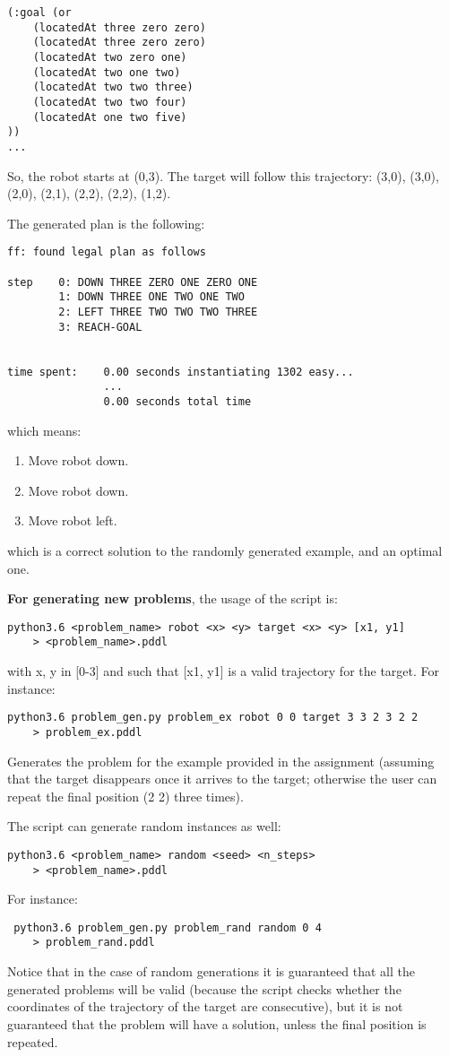 \documentclass{article}
\begin{document}
\begin{enumerate}
\begin{verbatim}
(:goal (or
    (locatedAt three zero zero)
    (locatedAt three zero zero)
    (locatedAt two zero one)
    (locatedAt two one two)
    (locatedAt two two three)
    (locatedAt two two four)
    (locatedAt one two five)
))
...
\end{verbatim}
So, the robot starts at (0,3). The target will follow this trajectory: (3,0), (3,0), (2,0), (2,1), (2,2), (2,2), (1,2).

The generated plan is the following:
\begin{verbatim}
ff: found legal plan as follows

step    0: DOWN THREE ZERO ONE ZERO ONE
        1: DOWN THREE ONE TWO ONE TWO
        2: LEFT THREE TWO TWO TWO THREE
        3: REACH-GOAL
     

time spent:    0.00 seconds instantiating 1302 easy...
               ...
               0.00 seconds total time

\end{verbatim}
which means:
\begin{enumerate}
    \item Move robot down.
    \item Move robot down.
    \item Move robot left.
\end{enumerate}
which is a correct solution to the randomly generated example, and an optimal one.

\textbf{For generating new problems}, the usage of the script is:
\begin{verbatim}
python3.6 <problem_name> robot <x> <y> target <x> <y> [x1, y1]
    > <problem_name>.pddl
\end{verbatim}
with x, y in [0-3] and such that [x1, y1] is a valid trajectory for the target. For instance:
\begin{verbatim}
python3.6 problem_gen.py problem_ex robot 0 0 target 3 3 2 3 2 2
    > problem_ex.pddl
\end{verbatim}
Generates the problem for the example provided in the assignment (assuming that the target disappears once it arrives to the target; otherwise the user can repeat the final position (2 2) three times). 

The script can generate random instances as well:
\begin{verbatim}
python3.6 <problem_name> random <seed> <n_steps>
    > <problem_name>.pddl
\end{verbatim}
For instance:
\begin{verbatim}
 python3.6 problem_gen.py problem_rand random 0 4
    > problem_rand.pddl
\end{verbatim}
Notice that in the case of random generations it is guaranteed that all the generated problems will be valid (because the script checks whether the coordinates of the trajectory of the target are consecutive), but it is not guaranteed that the problem will have a solution, unless the final position is repeated.
\end{enumerate}
\end{document}
